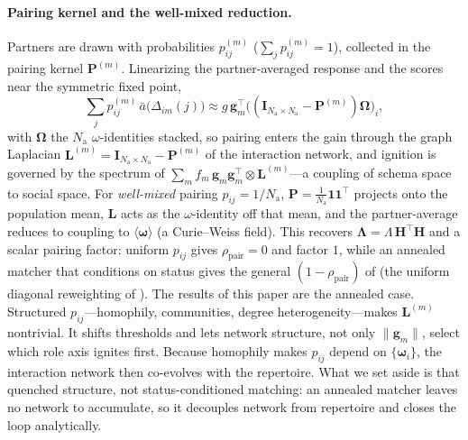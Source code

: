 \documentclass[
  aps,prx,
  reprint,
  superscriptaddress,
  nofootinbib,
  longbibliography
]{revtex4-2}
\newcommand{\w}{\bm{\omega}}
\newcommand{\g}{\mathbf{g}}
\newcommand{\Lam}{\bm{\Lambda}}
\newcommand{\Id}{\mathbf{I}}
\newcommand{\rhopair}{\rho_{\mathrm{pair}}}
\newcommand{\gain}{g}
\newcommand{\Nag}{N_{\mathrm{a}}}
\newcommand{\smref}[1]{\cite[Sec.~#1]{SM}}
\begin{document}
\paragraph{Pairing kernel and the well-mixed reduction.} Partners are drawn with probabilities $p_{ij}^{(m)}$ ($\sum_j p_{ij}^{(m)}=1$), collected in the pairing kernel $\bm{P}^{(m)}$. Linearizing the partner-averaged response and the scores near the symmetric fixed point,
\begin{equation}\label{eq:micro-lap}
\sum_j p_{ij}^{(m)}\,\bar a\big(\Delta_{im}(j)\big)\approx \gain\,\g_m^{\!\top}\big((\Id_{\Nag\times\Nag}-\bm{P}^{(m)})\bm{\Omega}\big)_i,
\end{equation}
with $\bm{\Omega}$ the $\Nag$ $\omega$-identities stacked, so pairing enters the gain through the graph Laplacian $\bm{L}^{(m)}=\Id_{\Nag\times\Nag}-\bm{P}^{(m)}$ of the interaction network, and ignition is governed by the spectrum of $\sum_mf_m\,\g_m\g_m^{\!\top}\otimes \bm{L}^{(m)}$---a coupling of schema space to social space. For \emph{well-mixed} pairing $p_{ij}=1/\Nag$, $\bm{P}=\tfrac1{\Nag}\mathbf 1\mathbf 1^{\!\top}$ projects onto the population mean, $\bm{L}$ acts as the $\omega$-identity off that mean, and the partner-average reduces to coupling to $\langle\w\rangle$ (a Curie--Weiss field). This recovers $\Lam=\Lambda\,\bm{H}^{\!\top}\bm{H}$ and a scalar pairing factor: uniform $p_{ij}$ gives $\rhopair=0$ and factor $1$, while an annealed matcher that conditions on status gives the general $(1-\rhopair)$ of \smref{S2\,B} (the uniform diagonal reweighting of \smref{S2}). The results of this paper are the annealed case. Structured $p_{ij}$---homophily, communities, degree heterogeneity---makes $\bm{L}^{(m)}$ nontrivial. It shifts thresholds and lets network structure, not only $\|\g_m\|$, select which role axis ignites first. Because homophily makes $p_{ij}$ depend on $\{\w_i\}$, the interaction network then co-evolves with the repertoire. What we set aside is that quenched structure, not status-conditioned matching: an annealed matcher leaves no network to accumulate, so it decouples network from repertoire and closes the loop analytically.
\end{document}
